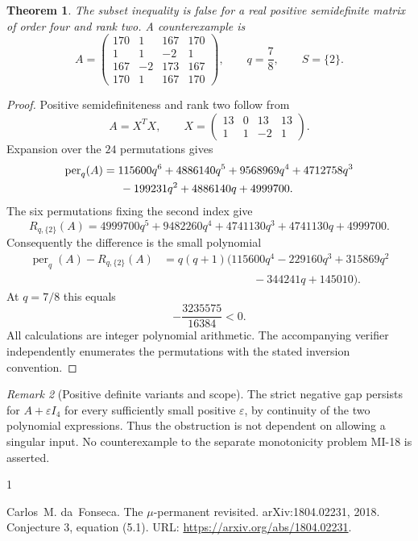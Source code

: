 \documentclass[10pt,a4paper]{article}
\newtheorem{theorem}{Theorem}[section]
\theoremstyle{remark}
\newtheorem{remark}[theorem]{Remark}
\begin{document}
\begin{theorem}
The subset inequality is false for a real positive semidefinite matrix of order four and rank two. A counterexample is
\[
 A=\begin{pmatrix}
 170&1&167&170\\
 1&1&-2&1\\
 167&-2&173&167\\
 170&1&167&170
 \end{pmatrix},\qquad q=\frac78,\qquad S=\{2\}.
\]
\end{theorem}
\begin{proof}
Positive semidefiniteness and rank two follow from
\[
 A=X^TX,\qquad X=\begin{pmatrix}13&0&13&13\\1&1&-2&1\end{pmatrix}.
\]
Expansion over the $24$ permutations gives
\begin{align*}
 \operatorname{per}_q(A)
 &=115600q^6+4886140q^5+9568969q^4+4712758q^3\\
 &\hspace{1.5em}-199231q^2+4886140q+4999700.
\end{align*}
The six permutations fixing the second index give
\[
 R_{q,\{2\}}(A)=4999700q^5+9482260q^4+4741130q^3+4741130q+4999700.
\]
Consequently the difference is the small polynomial
\begin{align*}
 \operatorname{per}_q(A)-R_{q,\{2\}}(A)
 &=q(q+1)\bigl(115600q^4-229160q^3+315869q^2\\
 &\hspace{8em}-344241q+145010\bigr).
\end{align*}
At $q=7/8$ this equals
\[
 -\frac{3235575}{16384}<0.
\]
All calculations are integer polynomial arithmetic. The accompanying verifier independently enumerates the permutations with the stated inversion convention.
\end{proof}

\begin{remark}[Positive definite variants and scope]
The strict negative gap persists for $A+\varepsilon I_4$ for every sufficiently small positive $\varepsilon$, by continuity of the two polynomial expressions. Thus the obstruction is not dependent on allowing a singular input. No counterexample to the separate monotonicity problem MI-18 is asserted.
\end{remark}

\begin{thebibliography}{1}

Carlos~M. da~Fonseca.
\newblock The $\mu$-permanent revisited.
\newblock arXiv:1804.02231, 2018.
\newblock Conjecture 3, equation (5.1).
\newblock URL: \url{https://arxiv.org/abs/1804.02231}.

\end{thebibliography}
\end{document}
